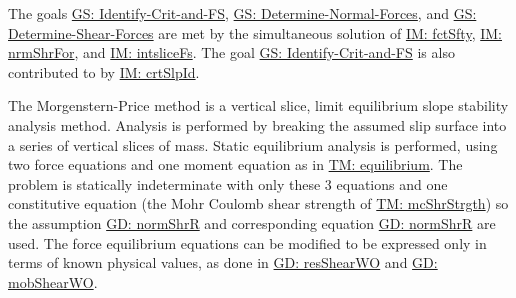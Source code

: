 \documentclass[12pt]{article}
\begin{document}
The goals \hyperref[identifyCritAndFS]{GS: Identify-Crit-and-FS}, \hyperref[determineNormalF]{GS: Determine-Normal-Forces}, and \hyperref[determineShearF]{GS: Determine-Shear-Forces} are met by the simultaneous solution of \hyperref[IM:fctSfty]{IM: fctSfty}, \hyperref[IM:nrmShrFor]{IM: nrmShrFor}, and \hyperref[IM:intsliceFs]{IM: intsliceFs}. The goal \hyperref[identifyCritAndFS]{GS: Identify-Crit-and-FS} is also contributed to by \hyperref[IM:crtSlpId]{IM: crtSlpId}.

The Morgenstern-Price method is a vertical slice, limit equilibrium slope stability analysis method. Analysis is performed by breaking the assumed slip surface into a series of vertical slices of mass. Static equilibrium analysis is performed, using two force equations and one moment equation as in \hyperref[TM:equilibrium]{TM: equilibrium}. The problem is statically indeterminate with only these 3 equations and one constitutive equation (the Mohr Coulomb shear strength of \hyperref[TM:mcShrStrgth]{TM: mcShrStrgth}) so the assumption \hyperref[GD:normShrR]{GD: normShrR} and corresponding equation \hyperref[GD:normShrR]{GD: normShrR} are used. The force equilibrium equations can be modified to be expressed only in terms of known physical values, as done in \hyperref[GD:resShearWO]{GD: resShearWO} and \hyperref[GD:mobShearWO]{GD: mobShearWO}.
\end{document}
